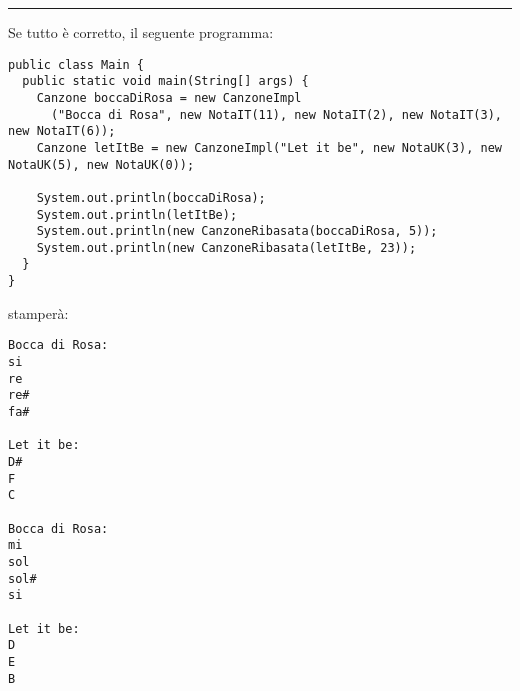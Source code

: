\documentclass{article}[10pt]
\begin{document}
\vspace*{3ex}
\hrule
\vspace*{3ex}
Se tutto \`e corretto, il seguente programma:
%
{\small
\begin{verbatim}
public class Main {
  public static void main(String[] args) {
    Canzone boccaDiRosa = new CanzoneImpl
      ("Bocca di Rosa", new NotaIT(11), new NotaIT(2), new NotaIT(3), new NotaIT(6));
    Canzone letItBe = new CanzoneImpl("Let it be", new NotaUK(3), new NotaUK(5), new NotaUK(0));

    System.out.println(boccaDiRosa);
    System.out.println(letItBe);
    System.out.println(new CanzoneRibasata(boccaDiRosa, 5));
    System.out.println(new CanzoneRibasata(letItBe, 23));
  }
}
\end{verbatim}}

\noindent
stamper\`a:
%
{\small
\begin{verbatim}
Bocca di Rosa:
si
re
re#
fa#

Let it be:
D#
F
C

Bocca di Rosa:
mi
sol
sol#
si

Let it be:
D
E
B
\end{verbatim}}
%
\end{document}
